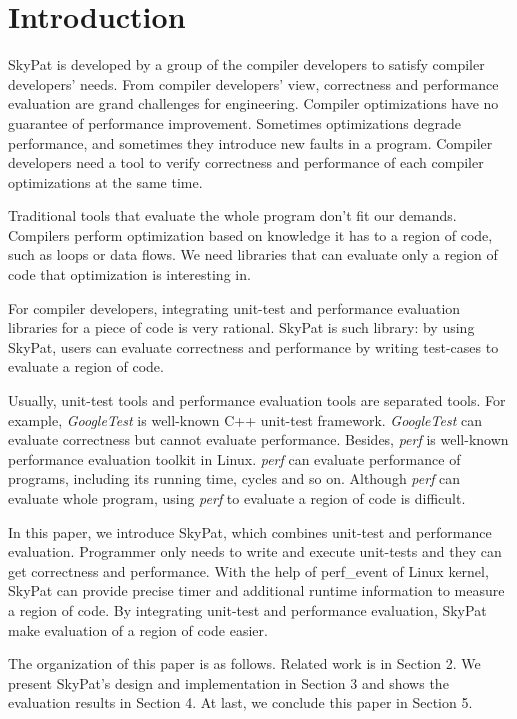 \documentclass[final]{ols}
\begin{document}
\section{Introduction}
SkyPat is developed by a group of the compiler developers to satisfy compiler developers' needs.
From compiler developers' view, correctness and performance evaluation are grand challenges for engineering.
Compiler optimizations have no guarantee of performance improvement.
Sometimes optimizations degrade performance, and sometimes they introduce new faults in a program.
Compiler developers need a tool to verify correctness and performance of each compiler optimizations at the same time.

Traditional tools that evaluate the whole program don't fit our demands.
Compilers perform optimization based on knowledge it has to a region of code, such as loops or data flows.
We need libraries that can evaluate only a region of code that optimization is interesting in.

For compiler developers, integrating unit-test and performance evaluation libraries for a piece of code is very rational.
SkyPat is such library: by using SkyPat, users can evaluate correctness and performance by writing test-cases to evaluate a region of code.

Usually, unit-test tools and performance evaluation tools are separated tools.
For example, \textit{GoogleTest} \cite{Google-test} is well-known C++ unit-test framework.
\textit{GoogleTest} can evaluate correctness but cannot evaluate performance.
Besides, \textit{perf} \cite{perf-tools} is well-known performance evaluation toolkit in Linux.
\textit{perf} can evaluate performance of programs, including its running time, cycles and so on.
Although \textit{perf} can evaluate whole program, using \textit{perf} to evaluate a region of code is difficult.

In this paper, we introduce SkyPat, which combines unit-test and performance evaluation.
Programmer only needs to write and execute unit-tests and they can get correctness and performance.
With the help of perf\_event of Linux kernel, SkyPat can provide precise timer and additional runtime information to measure a region of code.
By integrating unit-test and performance evaluation, SkyPat make evaluation of a region of code easier.

The organization of this paper is as follows.
Related work is in Section 2.
We present SkyPat's design and implementation in Section 3 and shows the evaluation results in Section 4.
At last, we conclude this paper in Section 5.
\end{document}
